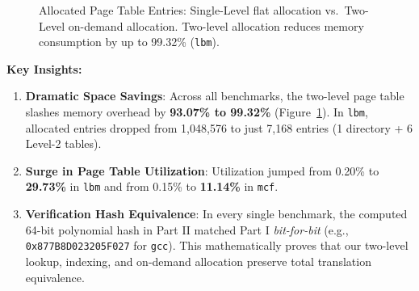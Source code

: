 \documentclass[11pt,a4paper]{article}
\begin{document}
\begin{figure}[h]
\centering
{}
\caption{Allocated Page Table Entries: Single-Level flat allocation vs.\ Two-Level on-demand allocation. Two-level allocation reduces memory consumption by up to 99.32\% (\texttt{lbm}).}
\label{fig:pt_space_comparison}
\end{figure}

\noindent\textbf{Key Insights:}
\begin{enumerate}
    \item \textbf{Dramatic Space Savings}: Across all benchmarks, the two-level page table slashes memory overhead by \textbf{93.07\% to 99.32\%} (Figure~\ref{fig:pt_space_comparison}). In \texttt{lbm}, allocated entries dropped from 1,048,576 to just 7,168 entries (1 directory + 6 Level-2 tables).
    \item \textbf{Surge in Page Table Utilization}: Utilization jumped from 0.20\% to \textbf{29.73\%} in \texttt{lbm} and from 0.15\% to \textbf{11.14\%} in \texttt{mcf}.
    \item \textbf{Verification Hash Equivalence}: In every single benchmark, the computed 64-bit polynomial hash in Part II matched Part I \emph{bit-for-bit} (e.g., \texttt{0x877B8D023205F027} for \texttt{gcc}). This mathematically proves that our two-level lookup, indexing, and on-demand allocation preserve total translation equivalence.
\end{enumerate}
\end{document}
